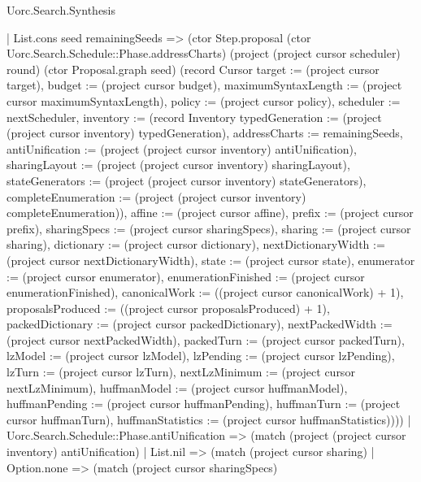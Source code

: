 \begin{lexlean}{Uorc.Search.Synthesis}
\begin{semanticmodule}
{      | List.cons seed remainingSeeds => (ctor Step.proposal (ctor Uorc.Search.Schedule::Phase.addressCharts) (project (project cursor scheduler) round) (ctor Proposal.graph seed) (record Cursor {target := (project cursor target), budget := (project cursor budget), maximumSyntaxLength := (project cursor maximumSyntaxLength), policy := (project cursor policy), scheduler := nextScheduler, inventory := (record Inventory {typedGeneration := (project (project cursor inventory) typedGeneration), addressCharts := remainingSeeds, antiUnification := (project (project cursor inventory) antiUnification), sharingLayout := (project (project cursor inventory) sharingLayout), stateGenerators := (project (project cursor inventory) stateGenerators), completeEnumeration := (project (project cursor inventory) completeEnumeration)}), affine := (project cursor affine), prefix := (project cursor prefix), sharingSpecs := (project cursor sharingSpecs), sharing := (project cursor sharing), dictionary := (project cursor dictionary), nextDictionaryWidth := (project cursor nextDictionaryWidth), state := (project cursor state), enumerator := (project cursor enumerator), enumerationFinished := (project cursor enumerationFinished), canonicalWork := ((project cursor canonicalWork) + 1), proposalsProduced := ((project cursor proposalsProduced) + 1), packedDictionary := (project cursor packedDictionary), nextPackedWidth := (project cursor nextPackedWidth), packedTurn := (project cursor packedTurn), lzModel := (project cursor lzModel), lzPending := (project cursor lzPending), lzTurn := (project cursor lzTurn), nextLzMinimum := (project cursor nextLzMinimum), huffmanModel := (project cursor huffmanModel), huffmanPending := (project cursor huffmanPending), huffmanTurn := (project cursor huffmanTurn), huffmanStatistics := (project cursor huffmanStatistics)})))
    | Uorc.Search.Schedule::Phase.antiUnification => (match (project (project cursor inventory) antiUnification)
      | List.nil => (match (project cursor sharing)
        | Option.none => (match (project cursor sharingSpecs)
}
\end{semanticmodule}
\end{lexlean}
